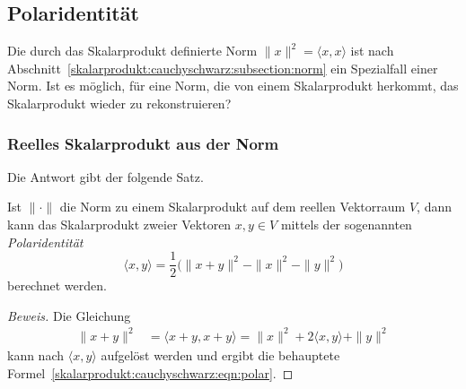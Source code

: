 %
%
\subsection{Polaridentität}
Die durch das Skalarprodukt definierte Norm
\( \|x\|^2=\langle x,x\rangle \)
ist nach Abschnitt~\ref{skalarprodukt:cauchyschwarz:subsection:norm}
ein Spezialfall einer Norm.
Ist es möglich, für eine Norm, die von einem Skalarprodukt herkommt,
das Skalarprodukt wieder zu rekonstruieren?

%
%
\subsubsection{Reelles Skalarprodukt aus der Norm}
Die Antwort gibt der folgende Satz.

\begin{satz}[Polaridentität]
\label{skalarprodukt:cauchyschwarz:satz:polarformel}
Ist $\|\cdot\|$ die Norm zu einem Skalarprodukt auf dem reellen Vektorraum
$V$, dann kann das Skalarprodukt zweier Vektoren $x,y\in V$ mittels
der sogenannten {\em Polaridentität}
%
\begin{equation}
\langle x, y\rangle
=
\frac12\bigl(
\|x+y\|^2 - \|x\|^2 - \|y\|^2 
\bigr)
\label{skalarprodukt:cauchyschwarz:eqn:polar}
\end{equation}
berechnet werden.
\end{satz}

\begin{proof}[Beweis]
Die Gleichung
\begin{align*}
\|x+y\|^2
&=
\langle x+y,x+y\rangle
=
\|x\|^2 + 2\langle x,y\rangle + \|y\|^2 
\end{align*}
kann nach $\langle x,y\rangle$ aufgelöst werden und ergibt
die behauptete Formel~\eqref{skalarprodukt:cauchyschwarz:eqn:polar}.
\end{proof}

% 
%
